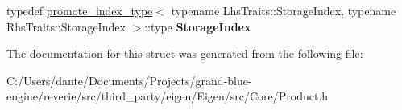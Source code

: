 \begin{DoxyCompactItemize}
\item 
\mbox{\label{struct_eigen_1_1internal_1_1traits_3_01_product_3_01_lhs_00_01_rhs_00_01_option_01_4_01_4_ad010e31abcd1be347b28e292a4b2a924}} 
typedef \mbox{\hyperlink{struct_eigen_1_1internal_1_1promote__index__type}{promote\+\_\+index\+\_\+type}}$<$ typename Lhs\+Traits\+::\+Storage\+Index, typename Rhs\+Traits\+::\+Storage\+Index $>$\+::type {\bfseries Storage\+Index}
\end{DoxyCompactItemize}


The documentation for this struct was generated from the following file\+:\begin{DoxyCompactItemize}
\item 
C\+:/\+Users/dante/\+Documents/\+Projects/grand-\/blue-\/engine/reverie/src/third\+\_\+party/eigen/\+Eigen/src/\+Core/Product.\+h\end{DoxyCompactItemize}
